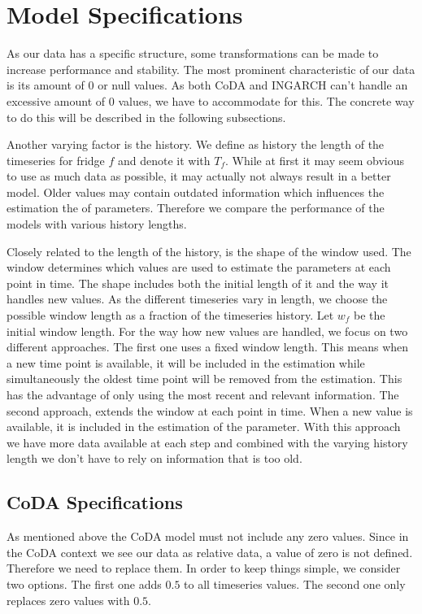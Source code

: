 \section{Model Specifications}
\label{sec: Model Specification}

As our data has a specific structure, some transformations can be made to increase performance and stability. The most prominent characteristic of our data is its amount of 0 or null values. As both CoDA and INGARCH can't handle an excessive amount of 0 values, we have to accommodate for this. The concrete way to do this will be described in the following subsections. 

Another varying factor is the history. We define as history the length of the timeseries for fridge $f$ and denote it with $T_f$. While at first it may seem obvious to use as much data as possible, it may actually not always result in a better model. Older values may contain outdated information which influences the estimation the of parameters. Therefore we compare the performance of the models with various history lengths. 

Closely related to the length of the history, is the shape of the window used. The window determines which values are used to estimate the parameters at each point in time. The shape includes both the initial length of it and the way it handles new values. As the different timeseries vary in length, we choose the possible window length as a fraction of the timeseries history. Let $w_f$ be the initial window length. For the way how new values are handled, we focus on two different approaches. The first one uses a fixed window length. This means when a new time point is available, it will be included in the estimation while simultaneously the oldest time point will be removed from the estimation. This has the advantage of only using the most recent and relevant information. The second approach, extends the window at each point in time. When a new value is available, it is included in the estimation of the parameter. With this approach we have more data available at each step and combined with the varying history length we don't have to rely on information that is too old.

\subsection{CoDA Specifications}
\label{sec: Coda Specifications}

As mentioned above the CoDA model must not include any zero values. Since in the CoDA context we see our data as relative data, a value of zero is not defined. Therefore we need to replace them. In order to keep things simple, we consider two options. The first one adds $0.5$ to all timeseries values. The second one only replaces zero values with $0.5$.

